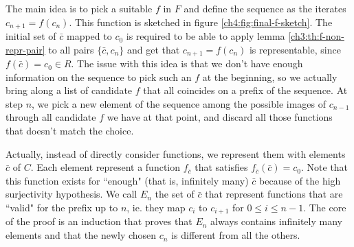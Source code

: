 \begin{figure*}[ht]
	\centering
	\caption{Graphical representation of the ``final" $f$}
	\label{ch4:fig:final-f-sketch}
\end{figure*}

The main idea is to pick a suitable $f$ in $F$ and define the sequence as the iterates $c_{n+1} = f(c_n)$. This function is sketched in figure \ref{ch4:fig:final-f-sketch}. The initial set of $\bar{c}$ mapped to $c_0$ is required to be able to apply lemma \ref{ch3:th:f-non-repr-pair} to all pairs $\{ \bar{c}, c_n \}$ and get that $c_{n+1} = f(c_n)$ is representable, since $f(\bar{c}) = c_0 \in R$.
The issue with this idea is that we don't have enough information on the sequence to pick such an $f$ at the beginning, so we actually bring along a list of candidate $f$ that all coincides on a prefix of the sequence. At step $n$, we pick a new element of the sequence among the possible images of $c_{n-1}$ through all candidate $f$ we have at that point, and discard all those functions that doesn't match the choice.

Actually, instead of directly consider functions, we represent them with elements $\bar{c}$ of $C$. Each element represent a function $f_{\bar{c}}$ that satisfies $f_{\bar{c}}(\bar{c}) = c_0$. Note that this function exists for ``enough" (that is, infinitely many) $\bar{c}$ because of the high surjectivity hypothesis. We call $E_n$ the set of $\bar{c}$ that represent functions that are ``valid" for the prefix up to $n$, ie. they map $c_{i}$ to $c_{i+1}$ for $0 \le i \le n - 1$. The core of the proof is an induction that proves that $E_n$ always contains infinitely many elements and that the newly chosen $c_n$ is different from all the others.

